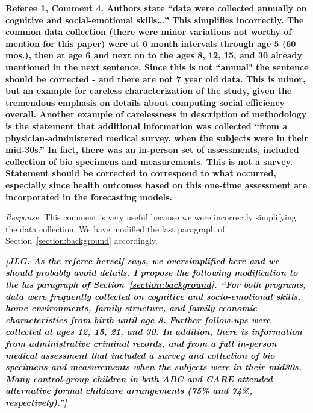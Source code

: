 \noindent \textbf{Referee 1, Comment 4. Authors state ``data were collected annually on cognitive and social-emotional skills…'' This simplifies incorrectly. The common data collection (there were minor variations not worthy of mention for this paper) were at 6 month intervals through age 5 (60 mos.), then at age 6 and next on to the ages 8, 12, 15, and 30 already mentioned in the next sentence. Since this is not ``annual" the sentence should be corrected - and there are not 7 year old data. This is minor, but an example for careless characterization of the study, given the tremendous emphasis on details about computing social efficiency overall. Another example of carelessness in description of methodology is the statement that additional information was collected ``from a physician-administered medical survey, when the subjects were in their mid-30s.'' In fact, there was an in-person set of assessments, included collection of bio specimens and measurements. This is not a survey. Statement should be corrected to correspond to what occurred, especially since health outcomes based on this one-time assessment are incorporated in the forecasting models.} 

\noindent \textit{Response.} This comment is very useful because we were incorrectly simplifying the data collection. We have modified the last paragraph of Section~\ref{section:background} accordingly.

\textit{\textbf{[JLG: As the referee herself says, we oversimplified here and we should probably avoid details. I propose the following modification to the las paragraph of Section~\ref{section:background}. ``For both programs, data were frequently collected on cognitive and socio-emotional skills, home environments, family structure, and family economic characteristics from birth until age 8. Further follow-ups were collected at ages 12, 15, 21, and 30. In addition, there is information from administrative criminal records, and from a full in-person medical assessment that included a survey and collection of bio specimens and measurements when the subjects were in their mid30s. Many control-group children in both ABC and CARE attended alternative formal childcare arrangements (75\% and 74\%, respectively).'']}} 

